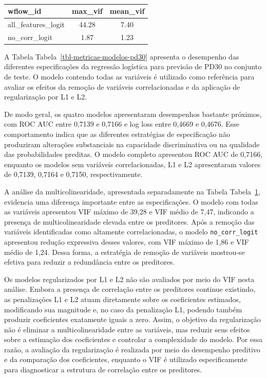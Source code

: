 \documentclass[
  brazilian,
  12pt,
  letterpaper,
  DIV=11,
  numbers=noendperiod]{scrartcl}
\begin{document}
{

\begin{longtable}[]{@{}lcc@{}}

\caption{\label{tbl-vif-modelos-pd30}}

\tabularnewline

\toprule\noalign{}
wflow\_id & max\_vif & mean\_vif \\
\midrule\noalign{}
\endhead
\bottomrule\noalign{}
\endlastfoot
all\_features\_logit & 44.28 & 7.40 \\
no\_corr\_logit & 1.87 & 1.23 \\

\end{longtable}

}

A Tabela Tabela~\ref{tbl-metricas-modelos-pd30} apresenta o desempenho
das diferentes especificações da regressão logística para previsão de
PD30 no conjunto de teste. O modelo contendo todas as variáveis é
utilizado como referência para avaliar os efeitos da remoção de
variáveis correlacionadas e da aplicação de regularização por L1 e L2.

De modo geral, os quatro modelos apresentaram desempenhos bastante
próximos, com ROC AUC entre 0,7139 e 0,7166 e log loss entre 0,4669 e
0,4676. Esse comportamento indica que as diferentes estratégias de
especificação não produziram alterações substanciais na capacidade
discriminativa ou na qualidade das probabilidades preditas. O modelo
completo apresentou ROC AUC de 0,7166, enquanto os modelos sem variáveis
correlacionadas, L1 e L2 apresentaram valores de 0,7139, 0,7164 e
0,7150, respectivamente.

A análise da multicolinearidade, apresentada separadamente na Tabela
Tabela~\ref{tbl-vif-modelos-pd30}, evidencia uma diferença importante
entre as especificações. O modelo com todas as variáveis apresentou VIF
máximo de 39,28 e VIF médio de 7,47, indicando a presença de
multicolinearidade elevada entre os preditores. Após a remoção das
variáveis identificadas como altamente correlacionadas, o modelo
\texttt{no\_corr\_logit} apresentou redução expressiva desses valores,
com VIF máximo de 1,86 e VIF médio de 1,24. Dessa forma, a estratégia de
remoção de variáveis mostrou-se efetiva para reduzir a redundância entre
os preditores.

Os modelos regularizados por L1 e L2 não são avaliados por meio do VIF
nesta análise. Embora a presença de correlação entre os preditores
continue existindo, as penalizações L1 e L2 atuam diretamente sobre os
coeficientes estimados, modificando sua magnitude e, no caso da
penalização L1, podendo também produzir coeficientes exatamente iguais a
zero. Assim, o objetivo da regularização não é eliminar a
multicolinearidade entre as variáveis, mas reduzir seus efeitos sobre a
estimação dos coeficientes e controlar a complexidade do modelo. Por
essa razão, a avaliação da regularização é realizada por meio do
desempenho preditivo e da comparação dos coeficientes, enquanto o VIF é
utilizado especificamente para diagnosticar a estrutura de correlação
entre os preditores.
\end{document}
